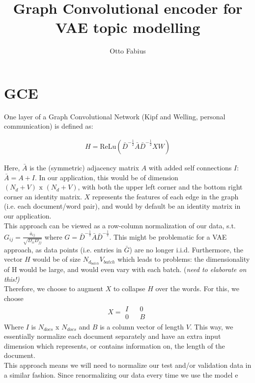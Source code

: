 \documentclass{article}
\author{Otto Fabius}
\title{Graph Convolutional encoder for VAE topic                                      modelling}
\begin{document}
\maketitle

\section{GCE}

One layer of a Graph Convolutional Network (Kipf and Welling, personal communication) is defined as: 

\begin{align}
H = \text{ReLu}(\bar{D}^{-\frac{1}{2}}\bar{A}\bar{D}^{-\frac{1}{2}}XW)
\end{align}

Here, $\bar{A}$ is the (symmetric) adjacency matrix $A$ with added self connections $I$:$\bar{A} = A+I$. In our application, this would be of dimension $(N_d + V) \text{ x } (N_d + V)$, with both the upper left corner and the bottom right corner an identity matrix. $X$ represents the features of each edge in the graph (i.e. each document/word pair), and would by default be an identity matrix in our application. \\
This approach can be viewed as a row-column normalization of our data, s.t. $G_{ij} = \frac{\bar{a}_{ij}}{\sqrt{D_{ii}D_{jj}}}$ where $G = \bar{D}^{-\frac{1}{2}}\bar{A}\bar{D}^{-\frac{1}{2}}$. This might be problematic for a VAE approach, as  data points (i.e. entries in $\bar{G}$) are no longer i.i.d. Furthermore, the vector $H$ would be of size $N_{d_{batch}} V_{batch}$ which leads to problems: the dimensionality of H would be large, and would even vary with each batch. (\textit{need to elaborate on this!)} \\
Therefore, we choose to augment $X$ to collapse $H$ over the words. For this, we choose 
\begin{align}
X = 
\begin{matrix} 
I && 0 \\
0 && B
\end{matrix}
\end{align}
Where $I$ is $N_{docs}$ x $N_{docs}$ and $B$ is a column vector of length $V$. This way, we essentially normalize each document separately and have an extra input dimension which represents, or contains information on, the length of the document. \\
This approach means we will need to normalize our test and/or validation data in a similar fashion. Since renormalizing our data every time we use the model e
\end{document}
